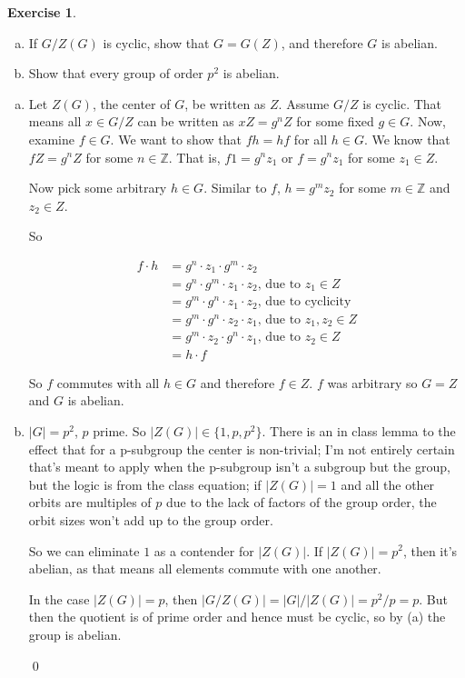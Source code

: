 \documentclass[11pt,oneside]{article}
\numberwithin{equation}{section}
\theoremstyle{definition}
\newtheorem{exercise}{Exercise}
\def\ZZ{\mathbb{Z}}
\begin{document}
\begin{exercise}
  
  \begin{enumerate}[(a)]
  \item
    If $G/Z(G)$ is cyclic, show that $G = G(Z)$, and therefore $G$ is abelian.
  \item
    Show that every group of order $p^2$ is abelian.  
  \end{enumerate}
\end{exercise}
\begin{solution}
  
  \begin{enumerate}[(a)]
  \item
    Let $Z(G)$, the center of $G$, be written as $Z$.  Assume $G/Z$ is cyclic.  That means all $x \in G/Z$ can be written
    as $ xZ = g^n Z$ for some fixed $g \in G$.  Now, examine $f \in G$.  We want to show that $fh = hf$ for all $h \in G$. 
    We know that $f Z = g^n Z$ for some $ n \in \ZZ$.  That is, $f 1 = g^n z_1$ or $f = g^n z_1$ for some $z_1 \in Z$.
    
    Now pick some arbitrary $h \in G$.  Similar to $f$, $h = g^m z_2$ for some $m \in \ZZ$ and $z_2 \in Z$.
    
    So
    
    \begin{align*}
      f \cdot h &= g^n \cdot z_1 \cdot g^m \cdot z_2 \\
      &=  g^n \cdot g^m \cdot z_1 \cdot z_2 \textrm {, due to } z_1 \in Z  \\
      &=  g^m \cdot g^n \cdot z_1 \cdot z_2 \textrm {, due to cyclicity } \\ 
      &=  g^m \cdot g^n \cdot z_2 \cdot z_1 \textrm {, due to } z_1, z_2 \in Z \\
      &=  g^m \cdot z_2 \cdot g^n \cdot z_1 \textrm {, due to } z_2 \in Z \\
      &= h \cdot f
    \end{align*}
    
    So $f$ commutes with all $h \in G$ and therefore $f\in Z$.  $f$ was arbitrary
    so $G = Z$ and $G$ is abelian.  
  \item
    $|G| = p^2$, $p$ prime.  So $|Z(G)| \in \{ 1, p, p^2\}$.  There is an in class lemma to the
    effect that for a p-subgroup the center is non-trivial; I'm not entirely certain that's meant to
    apply when the p-subgroup isn't a subgroup but the group, but the logic is from the class equation;
    if $|Z(G)| = 1$ and all the other orbits are multiples of $p$ due to the lack of factors of the
    group order, the orbit sizes  won't add up to the group order.
    
    So we can eliminate $1$ as a contender for $|Z(G)|$.  If $|Z(G)| = p^2$, then it's abelian, as that
    means all elements commute with one another.
    
    In the case $|Z(G)| = p$, then $|G / Z(G)| = |G| / |Z(G)| = p^2 / p = p$.  But then
    the quotient is of prime order and hence must be cyclic, so by (a) the group is abelian.
    
  
    \qed
    
  \end{enumerate}
\end{solution}
\end{document}

